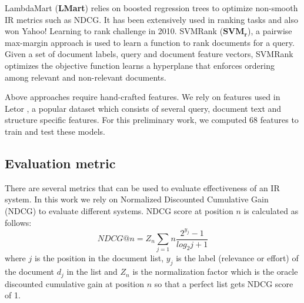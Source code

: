 LambdaMart \cite{Burges2010Report}  (\textbf{LMart}) relies on boosted 
regression trees to optimize non-smooth IR metrics such as NDCG. It has been 
extensively used in ranking tasks and also won Yahoo! Learning to rank 
challenge \cite{Chapelle2011Yahoo} in 2010. 
SVMRank \cite{Cao2006Sigir} ({$\boldsymbol{SVM_r}$}), a pairwise max-margin 
approach is used to learn a function to rank documents for a query. Given a set 
of document labels, query and document feature vectors, 
SVMRank optimizes the objective function learns a hyperplane that 
enforces ordering among relevant and non-relevant documents. 

Above approaches require hand-crafted features. We rely on features used in 
Letor \cite{liu2007letor}, a popular dataset which consists of several query, document text 
and structure specific features. For this preliminary work, we computed 68 
features to train and test these models.

\subsection{Evaluation metric}
\label{sec:evaluation}
There are several metrics that can be used to evaluate effectiveness of an IR 
system. 
In this work we rely on Normalized Discounted Cumulative Gain (NDCG) 
\cite{Jarvelin2000NDCG} 
to evaluate different systems. NDCG score at position $n$ is calculated as 
follows: 
\begin{equation}
 NDCG@n = Z_n \sum_{j=1}{n} \frac{2^{y_j} - 1}{log_2 j + 1}
\end{equation}
where $j$ is the position in the document list, $y_j$ is the label (relevance or 
effort) of 
the document $d_j$ in the list and $Z_n$ is the normalization factor which is 
the oracle 
discounted cumulative gain at position $n$ so that a perfect list gets NDCG 
score of 1.
